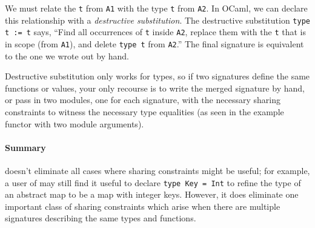 \noindent
We must relate the \verb|t| from \verb|A1| with the type \verb|t| from
\verb|A2|. In OCaml, we can
declare this relationship with a \emph{destructive substitution}.
The destructive substitution \verb|type t := t| says, ``Find all occurrences
of \verb|t| inside \verb|A2|, replace them with the \verb|t| that is in
scope (from \verb|A1|), and delete \verb|type t| from \verb|A2|.''
The final signature is equivalent to the one we wrote out by hand.

Destructive substitution only works for types, so if two signatures
define the same functions or values, your only recourse is to write the
merged signature by hand, or pass in two modules, one for each signature,
with the necessary sharing constraints to witness the necessary type equalities
(as seen in the example functor with two module arguments).

\paragraph{Summary}
\Backpack{} doesn't eliminate all cases where sharing constraints might be
useful; for example, a user of \Backpack{} may still find it useful to
declare \verb|type Key = Int| to refine the type of an abstract map
to be a map with integer keys.  However, it does eliminate one important
class of sharing constraints which arise when there are multiple signatures
describing the same types and functions.



